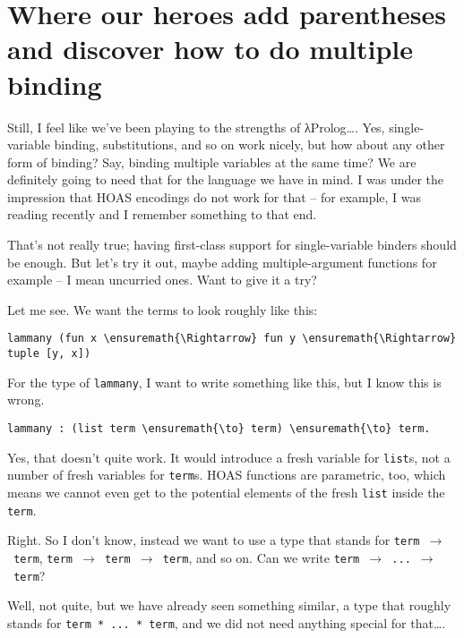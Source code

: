 \section{Where our heroes add parentheses and discover how to do
multiple
binding}\label{where-our-heroes-add-parentheses-and-discover-how-to-do-multiple-binding}

\heroSTUDENT{} Still, I feel like we've been playing to the strengths of
\foreignlanguage{greek}{λ}Prolog\ldots{}. Yes, single-variable binding, substitutions, and so on
work nicely, but how about any other form of binding? Say, binding
multiple variables at the same time? We are definitely going to need
that for the language we have in mind. I was under the impression that
HOAS encodings do not work for that -- for example, I was reading
\citet{keuchel2016needle} recently and I remember something to that end.

\heroADVISOR{} That's not really true; having first-class support for
single-variable binders should be enough. But let's try it out, maybe
adding multiple-argument functions for example -- I mean uncurried ones.
Want to give it a try?

\heroSTUDENT{} Let me see. We want the terms to look roughly like this:

\begin{verbatim}
lammany (fun x \ensuremath{\Rightarrow} fun y \ensuremath{\Rightarrow} tuple [y, x])
\end{verbatim}

For the type of \texttt{lammany}, I want to write something like this,
but I know this is wrong.

\begin{verbatim}
lammany : (list term \ensuremath{\to} term) \ensuremath{\to} term.
\end{verbatim}

\heroADVISOR{} Yes, that doesn't quite work. It would introduce a fresh
variable for \texttt{list}s, not a number of fresh variables for
\texttt{term}s. HOAS functions are parametric, too, which means we
cannot even get to the potential elements of the fresh \texttt{list}
inside the \texttt{term}.

\heroSTUDENT{} Right. So I don't know, instead we want to use a type that
stands for \texttt{term\ \ensuremath{\to}\ term},
\texttt{term\ \ensuremath{\to}\ term\ \ensuremath{\to}\ term}, and so on.
Can we write \texttt{term\ \ensuremath{\to}\ ...\ \ensuremath{\to}\ term}?

\heroADVISOR{} Well, not quite, but we have already seen something similar, a
type that roughly stands for \texttt{term\ *\ ...\ *\ term}, and we did
not need anything special for that\ldots{}.

